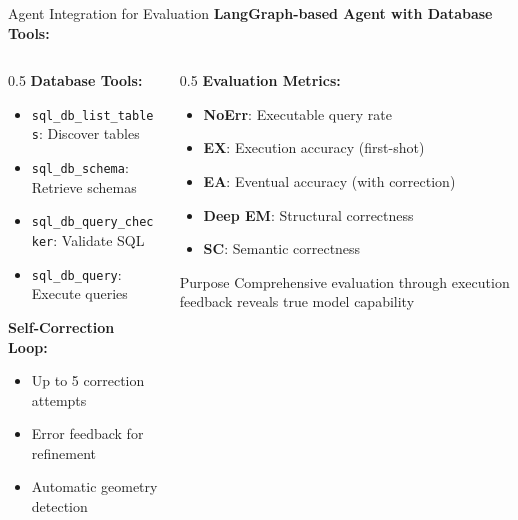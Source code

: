 \documentclass{beamer}
\begin{document}
\begin{frame}{Agent Integration for Evaluation}
\textbf{LangGraph-based Agent with Database Tools:}

\vspace{0.3cm}
\begin{columns}
\begin{column}{0.5\textwidth}
\textbf{Database Tools:}
\begin{itemize}
    \item \texttt{sql\_db\_list\_tables}: Discover tables
    \item \texttt{sql\_db\_schema}: Retrieve schemas
    \item \texttt{sql\_db\_query\_checker}: Validate SQL
    \item \texttt{sql\_db\_query}: Execute queries
\end{itemize}

\vspace{0.3cm}
\textbf{Self-Correction Loop:}
\begin{itemize}
    \item Up to 5 correction attempts
    \item Error feedback for refinement
    \item Automatic geometry detection
\end{itemize}
\end{column}
\begin{column}{0.5\textwidth}
\textbf{Evaluation Metrics:}
\begin{itemize}
    \item \textbf{NoErr}: Executable query rate
    \item \textbf{EX}: Execution accuracy (first-shot)
    \item \textbf{EA}: Eventual accuracy (with correction)
    \item \textbf{Deep EM}: Structural correctness
    \item \textbf{SC}: Semantic correctness
\end{itemize}

\vspace{0.3cm}
\begin{block}{Purpose}
Comprehensive evaluation through execution feedback reveals true model capability
\end{block}
\end{column}
\end{columns}
\end{frame}

\end{document}
